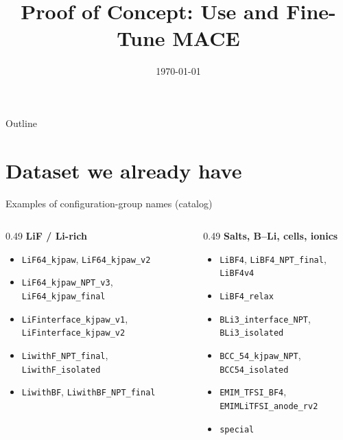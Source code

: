 \documentclass[aspectratio=169]{beamer}
\title{Proof of Concept: Use and Fine-Tune MACE}
\date{\today}
\begin{document}
\begin{frame}
  \titlepage
\end{frame}

\begin{frame}{Outline}
  \tableofcontents
\end{frame}

\section{Dataset we already have}

\begin{frame}{Examples of configuration-group names (catalog)}
  \small
  \begin{columns}[T,onlytextwidth]
    \begin{column}{0.49\textwidth}
      \textbf{LiF / Li-rich}
      \begin{itemize}\setlength\itemsep{0.15em}
        \item \texttt{LiF64\_kjpaw}, \texttt{LiF64\_kjpaw\_v2}
        \item \texttt{LiF64\_kjpaw\_NPT\_v3}, \texttt{LiF64\_kjpaw\_final}
        \item \texttt{LiFinterface\_kjpaw\_v1}, \texttt{LiFinterface\_kjpaw\_v2}
        \item \texttt{LiwithF\_NPT\_final}, \texttt{LiwithF\_isolated}
        \item \texttt{LiwithBF}, \texttt{LiwithBF\_NPT\_final}
      \end{itemize}
    \end{column}
    \begin{column}{0.49\textwidth}
      \textbf{Salts, B--Li, cells, ionics}
      \begin{itemize}\setlength\itemsep{0.15em}
        \item \texttt{LiBF4}, \texttt{LiBF4\_NPT\_final}, \texttt{LiBF4v4}
        \item \texttt{LiBF4\_relax}
        \item \texttt{BLi3\_interface\_NPT}, \texttt{BLi3\_isolated}
        \item \texttt{BCC\_54\_kjpaw\_NPT}, \texttt{BCC54\_isolated}
        \item \texttt{EMIM\_TFSI\_BF4}, \texttt{EMIMLiTFSI\_anode\_rv2}
        \item \texttt{special}
      \end{itemize}
    \end{column}
  \end{columns}
\end{frame}
\end{document}
